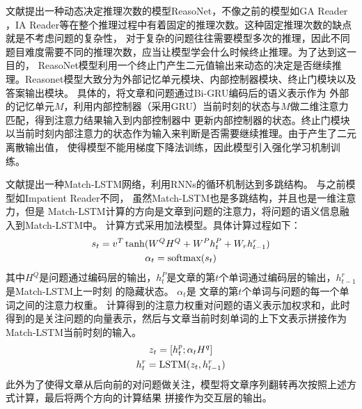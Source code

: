 文献\cite{Reasonet}提出一种动态决定推理次数的模型ReasoNet，不像之前的模型如GA Reader
，IA Reader等在整个推理过程中有着固定的推理次数。这种固定推理次数的缺点就是不考虑问题的复杂性，
对于复杂的问题往往需要模型多次的推理，因此不同题目难度需要不同的推理次数，应当让模型学会什么时候终止推理。为了达到这一目的，
ReasoNet模型利用一个终止门产生二元值输出来动态的决定是否继续推理。Reasonet模型大致分为外部记忆单元模块、内部控制器模块、终止门模块以及答案输出模块。
具体的，将文章和问题通过Bi-GRU编码后的语义表示作为
外部的记忆单元$M$，利用内部控制器（采用GRU）当前时刻的状态与$M$做二维注意力匹配，得到注意力结果输入到内部控制器中
更新内部控制器的状态。终止门模块以当前时刻内部注意力的状态作为输入来判断是否需要继续推理。由于产生了二元离散输出值，
使得模型不能用梯度下降法训练，因此模型引入强化学习机制训练。

文献\cite{MatchLSTM}提出一种Match-LSTM网络，利用RNNs的循环机制达到多跳结构。
与之前模型如Impatient Reader不同，
虽然Match-LSTM也是多跳结构，并且也是一维注意力，但是
Match-LSTM计算的方向是文章到问题的注意力，将问题的语义信息融入到Match-LSTM中。
计算方式采用加法模型。具体计算过程如下：
\begin{gather}
    s_t=v^T\tanh(W^QH^Q+W^Ph_t^P+W_rh_{t-1}^r) \notag \\
    \alpha_{t}=\text{softmax}(s_t)
\end{gather}
其中$H^Q$是问题通过编码层的输出，$h_t^P$是文章的第$t$个单词通过编码层的输出，$h_{t-1}^r$是Match-LSTM上一时刻
的隐藏状态。
$\alpha_{t}$是
文章的第$t$个单词与问题的每一个单词之间的注意力权重。
计算得到的注意力权重对问题的语义表示加权求和，此时得到的是关注问题的向量表示，然后与文章当前时刻单词的上下文表示拼接作为
Match-LSTM当前时刻的输入。
\begin{gather}
    z_t=[h_t^p;\alpha_tH^q] \notag \\
    h_{t}^r=\text{LSTM}(z_t,h_{t-1}^r)
\end{gather}
此外为了使得文章从后向前的对问题做关注，模型将文章序列翻转再次按照上述方式计算，最后将两个方向的计算结果
拼接作为交互层的输出。

